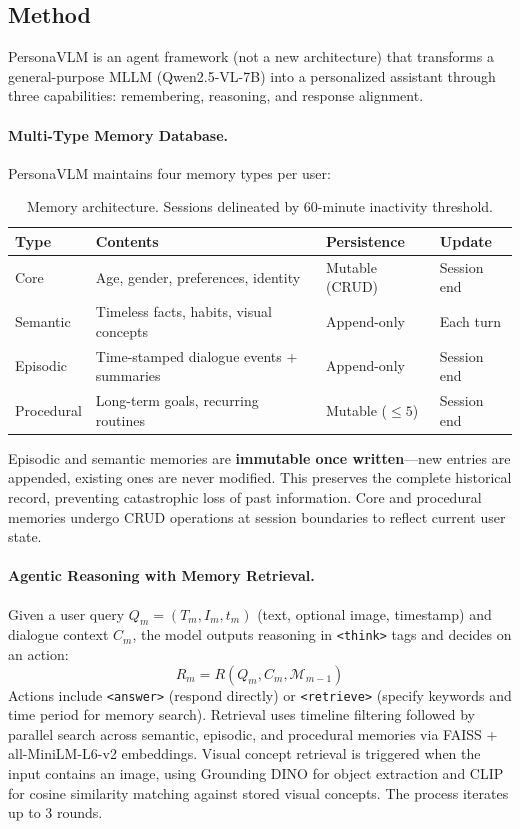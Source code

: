 \documentclass[11pt]{article}
\begin{document}
\subsection{Method}

PersonaVLM is an agent framework (not a new architecture) that transforms a general-purpose MLLM (Qwen2.5-VL-7B) into a personalized assistant through three capabilities: remembering, reasoning, and response alignment.

\paragraph{Multi-Type Memory Database.}
PersonaVLM maintains four memory types per user:

\begin{table}[h]
\centering
\caption{Memory architecture. Sessions delineated by 60-minute inactivity threshold.}
\begin{tabular}{llll}
\toprule
\textbf{Type} & \textbf{Contents} & \textbf{Persistence} & \textbf{Update} \\
\midrule
Core & Age, gender, preferences, identity & Mutable (CRUD) & Session end \\
Semantic & Timeless facts, habits, visual concepts & Append-only & Each turn \\
Episodic & Time-stamped dialogue events + summaries & Append-only & Session end \\
Procedural & Long-term goals, recurring routines & Mutable ($\leq 5$) & Session end \\
\bottomrule
\end{tabular}
\end{table}

Episodic and semantic memories are \textbf{immutable once written}---new entries are appended, existing ones are never modified. This preserves the complete historical record, preventing catastrophic loss of past information. Core and procedural memories undergo CRUD operations at session boundaries to reflect current user state.

\paragraph{Agentic Reasoning with Memory Retrieval.}
Given a user query $Q_m = (T_m, I_m, t_m)$ (text, optional image, timestamp) and dialogue context $C_m$, the model outputs reasoning in \texttt{<think>} tags and decides on an action:
\begin{equation}
    R_m = R(Q_m, C_m, \mathcal{M}_{m-1})
\end{equation}
Actions include \texttt{<answer>} (respond directly) or \texttt{<retrieve>} (specify keywords and time period for memory search). Retrieval uses timeline filtering followed by parallel search across semantic, episodic, and procedural memories via FAISS + all-MiniLM-L6-v2 embeddings. Visual concept retrieval is triggered when the input contains an image, using Grounding DINO for object extraction and CLIP for cosine similarity matching against stored visual concepts. The process iterates up to 3 rounds.
\end{document}
